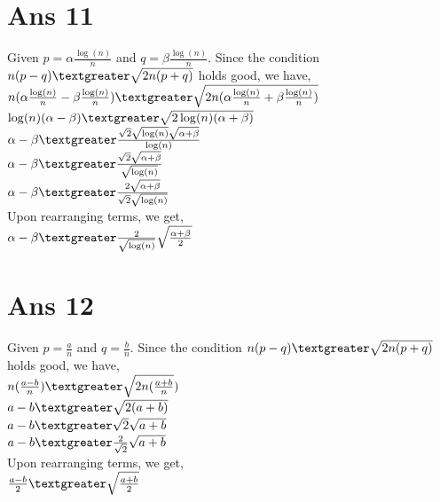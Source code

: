 \documentclass[10pt]{article}
\begin{document}
\section*{Ans 11}
\begin{flushleft}
Given $p = \alpha \frac{\log(n)}{n}$ and $q = \beta \frac{\log(n)}{n}$. Since the condition $n(p-q) \textgreater \sqrt{2n(p+q)}$ holds good, we have,\\
\vspace{0.5em}
$n (\alpha \frac{\log(n)}{n} -  \beta \frac{\log(n)}{n}) \textgreater \sqrt{2n(\alpha \frac{\log(n)}{n}+\beta \frac{\log(n)}{n})}$\\
\vspace{0.5em}
$\log(n) (\alpha - \beta) \textgreater \sqrt{2 \log(n) (\alpha + \beta)}$\\
\vspace{0.5em}
$\alpha - \beta \textgreater \frac{\sqrt{2} \sqrt{\log(n)} \sqrt{\alpha+\beta}}{\log(n)}$\\
\vspace{0.5em}
$\alpha - \beta \textgreater \frac{\sqrt{2} \sqrt{\alpha+\beta}}{\sqrt{\log(n)}}$\\
\vspace{0.5em}
$\alpha - \beta \textgreater \frac{2 \sqrt{\alpha+\beta}}{\sqrt{2} \sqrt{\log(n)}}$\\
\vspace{0.5em}
Upon rearranging terms, we get, \\
\vspace{0.5em}
$\alpha - \beta \textgreater \frac{2}{\sqrt{\log(n)}} \sqrt{\frac{\alpha+\beta}{2}}$\\
\end{flushleft}
\section*{Ans 12}
\begin{flushleft}
Given $p = \frac{a}{n}$ and $q = \frac{b}{n}$. Since the condition $n(p-q) \textgreater \sqrt{2n(p+q)}$ holds good, we have,\\
\vspace{0.5em}
$n (\frac{a-b}{n}) \textgreater \sqrt{2n(\frac{a+b}{n}})$\\
\vspace{0.5em}
$a-b \textgreater \sqrt{2(a+b)}$\\
\vspace{0.5em}
$a-b \textgreater \sqrt{2} \sqrt{a+b}$\\
\vspace{0.5em}
$a-b \textgreater \frac{2}{\sqrt{2}} \sqrt{a+b}$\\
\vspace{0.5em}
Upon rearranging terms, we get, \\
\vspace{0.5em}
$\frac{a-b}{2} \textgreater \sqrt{\frac{a+b}{2}}$
\end{flushleft}
\end{document}
